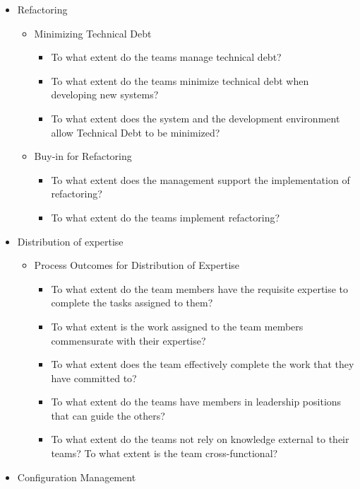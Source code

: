 \begin{appendices}
\begin{itemize}
	\item Refactoring 
		\begin{itemize}
			\item Minimizing Technical Debt 
				\begin{itemize}
					\item To what extent do the teams manage technical debt? 
					\item To what extent do the teams minimize technical debt when developing new systems? 
					\item To what extent does the system and the development environment allow Technical Debt to be minimized? 
				\end{itemize}
			\item Buy-in for Refactoring 
				\begin{itemize}
					\item To what extent does the management support the implementation of refactoring? 
					\item To what extent do the teams implement refactoring? 
				\end{itemize}
		\end{itemize}
	\item Distribution of expertise 
		\begin{itemize}
			\item Process Outcomes for Distribution of Expertise
				\begin{itemize}
					\item To what extent do the team members have the requisite expertise to complete the tasks assigned to them? 
					\item To what extent is the work assigned to the team members commensurate with their expertise? 
					\item To what extent does the team effectively complete the work that they have committed to? 
					\item To what extent do the teams have members in leadership positions that can guide the others? 
					\item To what extent do the teams not rely on knowledge external to their teams? 
					\addition To what extent is the team cross-functional?
				\end{itemize}
		\end{itemize}
	\item Configuration Management

\end{itemize}
\end{appendices}

